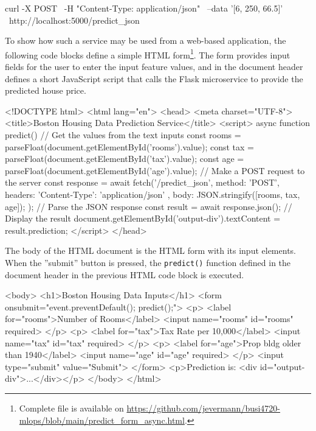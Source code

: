 \begin{samepage}
\begin{bashcode}
curl -X POST \
     -H "Content-Type: application/json" \
     --data '[6, 250, 66.5]' \
     http://localhost:5000/predict_json
\end{bashcode}
\end{samepage}

To show how such a service may be used from a web-based application, the following code blocks define a simple HTML form\footnote{Complete file is available on \url{https://github.com/jevermann/busi4720-mlops/blob/main/predict_form_async.html}.}. The form provides input fields for the user to enter the input feature values, and in the document header defines a short JavaScript script that calls the Flask microservice to provide the predicted house price. 

\begin{samepage}
\begin{htmlcode}
<!DOCTYPE html>
<html lang="en">
 <head>
  <meta charset="UTF-8">
   <title>Boston Housing Data Prediction Service</title>
   <script>
    async function predict() {
     // Get the values from the text inputs
     const rooms = parseFloat(document.getElementById('rooms').value);
     const tax = parseFloat(document.getElementById('tax').value);
     const age = parseFloat(document.getElementById('age').value);
     // Make a POST request to the server
     const response = await fetch('/predict_json', {
       method: 'POST',
       headers: { 'Content-Type': 'application/json' },
       body: JSON.stringify([rooms, tax, age]);
     });
     // Parse the JSON response
     const result = await response.json();
     // Display the result
     document.getElementById('output-div').textContent
       = result.prediction;
   }
  </script>
 </head>
\end{htmlcode}
\end{samepage}

The body of the HTML document is the HTML form with its input elements. When the ''submit'' button is pressed, the \texttt{predict()} function defined in the document header in the previous HTML code block is executed. 

\begin{samepage}
\begin{htmlcode}
 <body>
  <h1>Boston Housing Data Inputs</h1>
  <form onsubmit="event.preventDefault(); predict();">
   <p>
    <label for="rooms">Number of Rooms</label>
    <input name="rooms" id="rooms" required>
   </p>
   <p>
    <label for="tax">Tax Rate per 10,000</label>
    <input name="tax" id="tax" required>
   </p>
   <p>
    <label for="age">Prop bldg older than 1940</label>
    <input name="age" id="age" required>
   </p>
   <input type="submit" value="Submit">
  </form>
  <p>Prediction is: <div id="output-div">...</div></p>
 </body>
</html>
\end{htmlcode}
\end{samepage}

